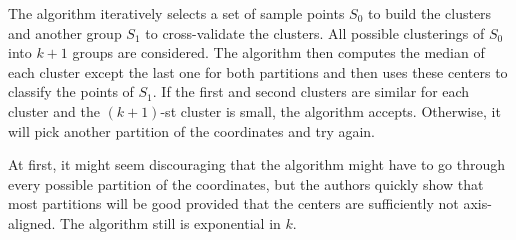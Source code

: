 \documentclass[11pt,letter]{article}
\begin{document}
The algorithm iteratively selects a set of sample points $S_0$ to build the clusters and another group $S_1$ to cross-validate the clusters. All possible clusterings of $S_0$ into $k+1$ groups are considered. The algorithm then computes the median of each cluster except the last one for both partitions and then uses these centers to classify the points of $S_1$. If the first and second clusters are similar for each cluster and the $(k+1)$-st cluster is small, the algorithm accepts. Otherwise, it will pick another partition of the coordinates and try again.  

At first, it might seem discouraging that the algorithm might have to go through every possible partition of the coordinates, but the authors quickly show that most partitions will be good provided that the centers are sufficiently not axis-aligned. The algorithm still is exponential in $k$.





 
 
\end{document}
